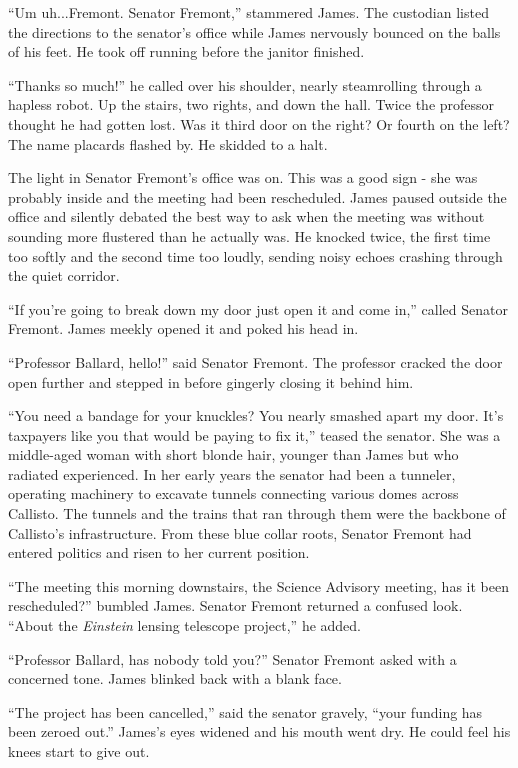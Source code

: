\documentclass[12pt]{article} %
\begin{document}
``Um uh...Fremont. Senator Fremont,'' stammered James. The custodian listed the directions to the senator's office while James nervously bounced on the balls of his feet. He took off running before the janitor finished.

``Thanks so much!'' he called over his shoulder, nearly steamrolling through a hapless robot. Up the stairs, two rights, and down the hall. Twice the professor thought he had gotten lost. Was it third door on the right? Or fourth on the left? The name placards flashed by. He skidded to a halt.

The light in Senator Fremont's office was on. This was a good sign - she was probably inside and the meeting had been rescheduled. James paused outside the office and silently debated the best way to ask when the meeting was without sounding more flustered than he actually was. He knocked twice, the first time too softly and the second time too loudly, sending noisy echoes crashing through the quiet corridor.

``If you're going to break down my door just open it and come in,'' called Senator Fremont. James meekly opened it and poked his head in.

``Professor Ballard, hello!'' said Senator Fremont. The professor cracked the door open further and stepped in before gingerly closing it behind him.

``You need a bandage for your knuckles? You nearly smashed apart my door. It's taxpayers like you that would be paying to fix it,'' teased the senator. She was a middle-aged woman with short blonde hair, younger than James but who radiated experienced. In her early years the senator had been a tunneler, operating machinery to excavate tunnels connecting various domes across Callisto. The tunnels and the trains that ran through them were the backbone of Callisto's infrastructure. From these blue collar roots, Senator Fremont had entered politics and risen to her current position.

``The meeting this morning downstairs, the Science Advisory meeting, has it been rescheduled?'' bumbled James. Senator Fremont returned a confused look. ``About the \textit{Einstein} lensing telescope project,'' he added.

``Professor Ballard, has nobody told you?'' Senator Fremont asked with a concerned tone. James blinked back with a blank face.

``The project has been cancelled,'' said the senator gravely, ``your funding has been zeroed out.''
James's eyes widened and his mouth went dry. He could feel his knees start to give out.
\end{document}
